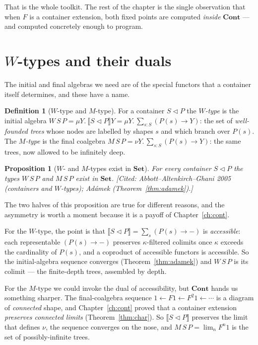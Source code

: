 \documentclass[11pt,a4paper]{book}
\newcommand{\Set}{\mathbf{Set}}
\newcommand{\Cont}{\mathbf{Cont}}
\newcommand{\cont}[2]{#1 \triangleleft #2}
\newcommand{\Ext}[1]{\llbracket #1 \rrbracket}
\theoremstyle{plain}
\newtheorem{Proposition}[Theorem]{Proposition}
\theoremstyle{definition}
\newtheorem{Definition}[Theorem]{Definition}
\theoremstyle{remark}
\newcommand{\prov}[1]{\hfill\textsf{\footnotesize[#1]}}
\begin{document}
That is the whole toolkit. The rest of the chapter is the single observation that when $F$ is
a container extension, both fixed points are computed \emph{inside} $\Cont$ --- and computed
concretely enough to program.

\section{$W$-types and their duals}
\label{sec:moncomon-wtypes}

The initial and final algebras we need are of the special functors that a container itself
determines, and these have a name.

\begin{Definition}[$W$-type and $M$-type]\label{def:wtype}
For a container $\cont SP$ the \emph{$W$-type} is the initial algebra
$W\,S\,P=\mu Y.\ \Ext{\cont SP}Y=\mu Y.\,\textstyle\sum_{s:S}(P(s)\to Y)$: the set of
\emph{well-founded trees} whose nodes are labelled by shapes $s$ and which branch over $P(s)$.
The \emph{$M$-type} is the final coalgebra $M\,S\,P=\nu Y.\,\sum_{s:S}(P(s)\to Y)$: the same
trees, now allowed to be infinitely deep.
\end{Definition}

\begin{Proposition}[$W$- and $M$-types exist in $\Set$]\label{prop:wm-exist}
For every container $\cont SP$ the types $W\,S\,P$ and $M\,S\,P$ exist in $\Set$.
\prov{Cited: Abbott--Altenkirch--Ghani 2005 (containers and $W$-types); Ad\'amek
(Theorem~\ref{thm:adamek}).}
\end{Proposition}

The two halves of this proposition are true for different reasons, and the asymmetry is
worth a moment because it is a payoff of Chapter~\ref{ch:cont}.

For the $W$-type, the point is that $\Ext{\cont SP}=\sum_{s}(P(s)\to-)$ is
\emph{accessible}: each representable $(P(s)\to-)$ preserves $\kappa$-filtered colimits once
$\kappa$ exceeds the cardinality of $P(s)$, and a coproduct of accessible functors is
accessible. So the initial-algebra sequence converges (Theorem~\ref{thm:adamek}) and $W\,S\,P$
is its colimit --- the finite-depth trees, assembled by depth.

For the $M$-type we could invoke the dual of accessibility, but $\Cont$ hands us something
sharper. The final-coalgebra sequence $1\leftarrow F1\leftarrow F^{2}1\leftarrow\cdots$ is a
diagram of \emph{connected} shape, and Chapter~\ref{ch:cont} proved that a container extension
\emph{preserves connected limits} (Theorem~\ref{thm:char}). So $\Ext{\cont SP}$ preserves the
limit that defines $\nu$, the sequence converges on the nose, and $M\,S\,P=\lim_{n}F^{n}1$ is
the set of possibly-infinite trees.
\end{document}
